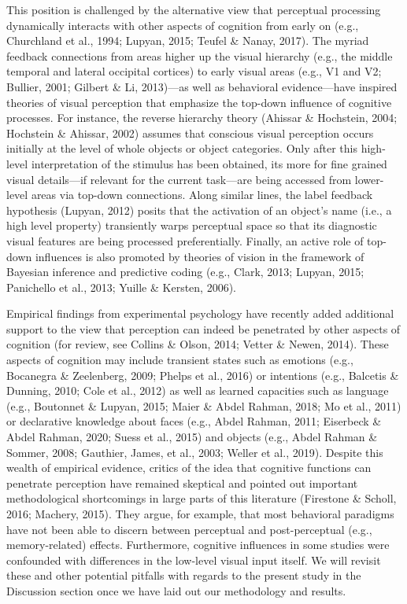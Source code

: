 \documentclass[
  english,
  man,floatsintext]{apa7}
\begin{document}
This position is challenged by the alternative view that perceptual processing dynamically interacts with other aspects of cognition from early on (e.g., Churchland et al., 1994; Lupyan, 2015; Teufel \& Nanay, 2017). The myriad feedback connections from areas higher up the visual hierarchy (e.g., the middle temporal and lateral occipital cortices) to early visual areas (e.g., V1 and V2; Bullier, 2001; Gilbert \& Li, 2013)---as well as behavioral evidence---have inspired theories of visual perception that emphasize the top-down influence of cognitive processes. For instance, the reverse hierarchy theory (Ahissar \& Hochstein, 2004; Hochstein \& Ahissar, 2002) assumes that conscious visual perception occurs initially at the level of whole objects or object categories. Only after this high-level interpretation of the stimulus has been obtained, its more for fine grained visual details---if relevant for the current task---are being accessed from lower-level areas via top-down connections. Along similar lines, the label feedback hypothesis (Lupyan, 2012) posits that the activation of an object's name (i.e., a high level property) transiently warps perceptual space so that its diagnostic visual features are being processed preferentially. Finally, an active role of top-down influences is also promoted by theories of vision in the framework of Bayesian inference and predictive coding (e.g., Clark, 2013; Lupyan, 2015; Panichello et al., 2013; Yuille \& Kersten, 2006).

Empirical findings from experimental psychology have recently added additional support to the view that perception can indeed be penetrated by other aspects of cognition (for review, see Collins \& Olson, 2014; Vetter \& Newen, 2014). These aspects of cognition may include transient states such as emotions (e.g., Bocanegra \& Zeelenberg, 2009; Phelps et al., 2016) or intentions (e.g., Balcetis \& Dunning, 2010; Cole et al., 2012) as well as learned capacities such as language (e.g., Boutonnet \& Lupyan, 2015; Maier \& Abdel Rahman, 2018; Mo et al., 2011) or declarative knowledge about faces (e.g., Abdel Rahman, 2011; Eiserbeck \& Abdel Rahman, 2020; Suess et al., 2015) and objects (e.g., Abdel Rahman \& Sommer, 2008; Gauthier, James, et al., 2003; Weller et al., 2019). Despite this wealth of empirical evidence, critics of the idea that cognitive functions can penetrate perception have remained skeptical and pointed out important methodological shortcomings in large parts of this literature (Firestone \& Scholl, 2016; Machery, 2015). They argue, for example, that most behavioral paradigms have not been able to discern between perceptual and post-perceptual (e.g., memory-related) effects. Furthermore, cognitive influences in some studies were confounded with differences in the low-level visual input itself. We will revisit these and other potential pitfalls with regards to the present study in the Discussion section once we have laid out our methodology and results.
\end{document}
